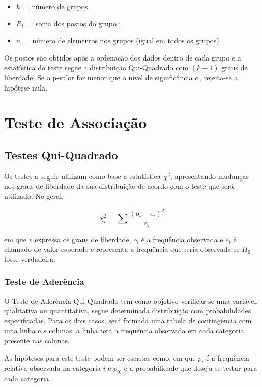 \documentclass[
]{estat/estat}
\providecommand{\tightlist}{%
  \setlength{\itemsep}{0pt}\setlength{\parskip}{0pt}}\usepackage{longtable,booktabs,array}
\begin{document}
\begin{itemize}
\tightlist
\item
  \(k=\) número de grupos
\item
  \(R_i=\) soma dos postos do grupo i
\item
  \(n=\) número de elementos nos grupos (igual em todos os grupos)
\end{itemize}

Os postos são obtidos após a ordenação dos dados dentro de cada grupo e
a estatística do teste segue a distribuição Qui-Quadrado com \((k-1)\)
graus de liberdade. Se o p-valor for menor que o nível de significância
\(\alpha\), rejeita-se a hipótese nula.

\hypertarget{teste-de-associauxe7uxe3o}{%
\section{Teste de Associação}\label{teste-de-associauxe7uxe3o}}

\hypertarget{testes-qui-quadrado}{%
\subsection{Testes Qui-Quadrado}\label{testes-qui-quadrado}}

Os testes a seguir utilizam como base a estatística \(\chi^{2}\),
apresentando mudanças nos graus de liberdade da sua distribuição de
acordo com o teste que será utilizado. No geral,

\[ \chi_{v}^{2} = \sum \frac{(o_{i} - e_{i})^{2}}{e_{i}} \]

em que \(v\) expressa os graus de liberdade, \(o_{i}\) é a frequência
observada e \(e_{i}\) é chamado de valor esperado e representa a
frequência que seria observada se \(H_{0}\) fosse verdadeira.

\hypertarget{teste-de-aderuxeancia}{%
\subsubsection{Teste de Aderência}\label{teste-de-aderuxeancia}}

O Teste de Aderência Qui-Quadrado tem como objetivo verificar se uma
variável, qualitativa ou quantitativa, segue determinada distribuição
com probabilidades especificadas. Para os dois casos, será formada uma
tabela de contingência com uma linha e \(s\) colunas; a linha terá a
frequência observada em cada categoria presente nas colunas.

As hipóteses para este teste podem ser escritas como:
 em que \(p_{i}\) é a
frequência relativa observada na categoria \(i\) e \(p_{i0}\) é a
probabilidade que deseja-se testar para cada categoria.
\end{document}
